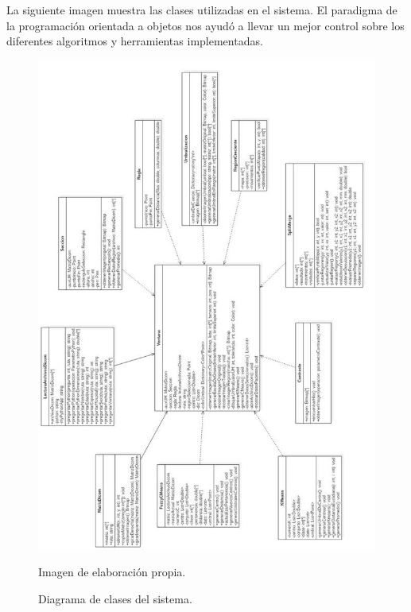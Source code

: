 \documentclass[12pt]{report}
\begin{document}
La siguiente imagen muestra las clases utilizadas en el sistema. El paradigma de la programación orientada a objetos nos ayudó a llevar un mejor control sobre los diferentes algoritmos y herramientas implementadas.
\newpage
\begin{figure}[H]
\centering
\includegraphics[width = 15 cm, height = 18 cm]{diagramaClases}
\caption{Diagrama de clases del sistema.}
Imagen de elaboración propia.
\end{figure}



\end{document}
